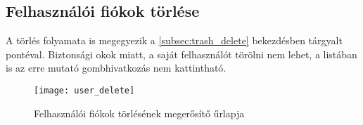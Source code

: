 \subsection{Felhasználói fiókok törlése}
\label{subsec:user_delete}

A törlés folyamata is megegyezik a \ref{subsec:trash_delete} bekezdésben tárgyalt pontéval. Biztonsági okok miatt, a saját felhasználót törölni nem lehet, a listában is az erre mutató gombhivatkozás nem kattintható.

\begin{figure}[H]
	\centering
	\texttt{[image: user\_delete]}
	\caption{Felhasználói fiókok törlésének megerősítő űrlapja}
	\label{fig:user_delete}
\end{figure}